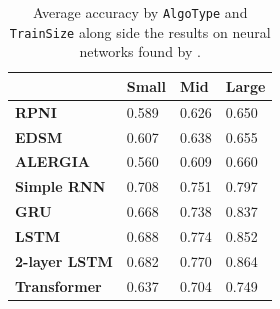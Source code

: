 \documentclass[twoside,11pt]{article}
\newcommand{\ttt}[1]{\texttt{#1}}
\newcommand{\tbf}[1]{\textbf{#1}}
\newcommand{\tttx}[1]{\ttt{#1}\xspace}
\newcommand{\TrainSize}{\tttx{TrainSize}}
\newcommand{\AlgoType}{\tttx{AlgoType}}
\begin{document}
\begin{table}[ht]
  \centering
  \begin{tabular}{llll}
    \toprule
                           & \tbf{Small} & \tbf{Mid} & \tbf{Large} \\
    \midrule
    \tbf{RPNI}             & 0.589       & 0.626     & 0.650       \\
    \tbf{EDSM}             & 0.607       & 0.638     & 0.655       \\
    \tbf{ALERGIA}          & 0.560       & 0.609     & 0.660       \\
    \midrule
    \tbf{Simple RNN}       & 0.708       & 0.751     & 0.797       \\
    \tbf{GRU}              & 0.668       & 0.738     & 0.837       \\
    \tbf{LSTM}             & 0.688       & 0.774     & 0.852       \\
    \tbf{2-layer LSTM}     & 0.682       & 0.770     & 0.864       \\
    \tbf{Transformer}      & 0.637       & 0.704     & 0.749       \\
    \bottomrule
  \end{tabular}
  \caption{Average accuracy by \AlgoType and \TrainSize along side the results on neural networks found by \citet{heinz-etal-2022-mlregtest}.}
  \label{tab:acc-network-by-train}
\end{table}
\end{document}
